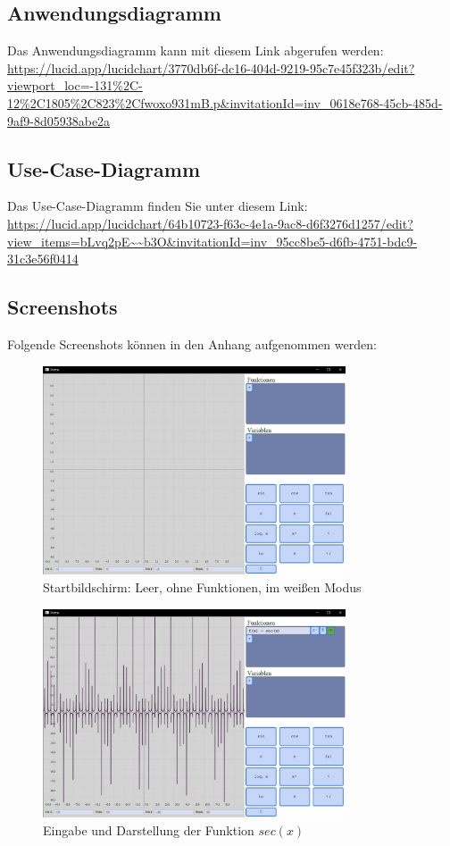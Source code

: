 \documentclass[a4paper]{article}
\begin{document}
\subsection{Anwendungsdiagramm}
Das Anwendungsdiagramm kann mit diesem Link abgerufen werden:
\newline
\url{https://lucid.app/lucidchart/3770db6f-dc16-404d-9219-95c7e45f323b/edit?viewport_loc=-131%2C-12%2C1805%2C823%2Cfwoxo931mB.p&invitationId=inv_0618e768-45cb-485d-9af9-8d05938abe2a}

\subsection{Use-Case-Diagramm}
Das Use-Case-Diagramm finden Sie unter diesem Link:
\newline
\url{https://lucid.app/lucidchart/64b10723-f63c-4e1a-9ac8-d6f3276d1257/edit?view_items=bLvq2pE~~b3O&invitationId=inv_95cc8be5-d6fb-4751-bdc9-31c3e56f0414}

\clearpage

\subsection{Screenshots}
Folgende Screenshots können in den Anhang aufgenommen werden:
\begin{figure}[ht]
	\centering
	\includegraphics[width=0.8\textwidth]{Resources/startbildschirm.png}
	\caption{Startbildschirm: Leer, ohne Funktionen, im weißen Modus}
	\label{fig:startbildschirm}
\end{figure}

\begin{figure}[ht]
	\centering
	\includegraphics[width=0.8\textwidth]{Resources/eingabe_darstellung.png}
	\caption{Eingabe und Darstellung der Funktion $sec(x)$}
	\label{fig:eingabe_darstellung}
\end{figure}
\end{document}
